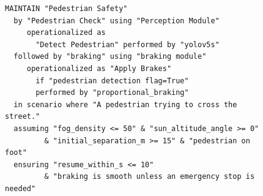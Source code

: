 
\usepackage[T1]{fontenc}
\usepackage[scaled=0.86]{inconsolata}   %
\usepackage{upquote}                      %
\usepackage{listings}
\usepackage{xcolor}


\newcommand{\dslkw}[1]{\textbf{\texttt{#1}}}          %
\newcommand{\dsllit}[1]{{\color{dslstr}\texttt{#1}}}   %
\newcommand{\dslid}[1]{\texttt{#1}}                    %

\begin{figure}[t]
\begin{lstlisting}[caption={The requirement $R_0$ of the study, in the REAL DSL
  (abridged: the tasks' input/output declarations are omitted). Lines 2--7
  name the system $S$, line 9 the scenario, lines 10--11 the domain
  assumptions $D$, lines 12--13 the soft goals in $R$.},label={lst:r0}]
MAINTAIN "Pedestrian Safety"
  by "Pedestrian Check" using "Perception Module"
     operationalized as
       "Detect Pedestrian" performed by "yolov5s"
  followed by "braking" using "braking module"
     operationalized as "Apply Brakes"
       if "pedestrian detection flag=True"
       performed by "proportional_braking"
  in scenario where "A pedestrian trying to cross the street."
  assuming "fog_density <= 50" & "sun_altitude_angle >= 0"
         & "initial_separation_m >= 15" & "pedestrian on foot"
  ensuring "resume_within_s <= 10"
         & "braking is smooth unless an emergency stop is needed"
\end{lstlisting}
\end{figure}

